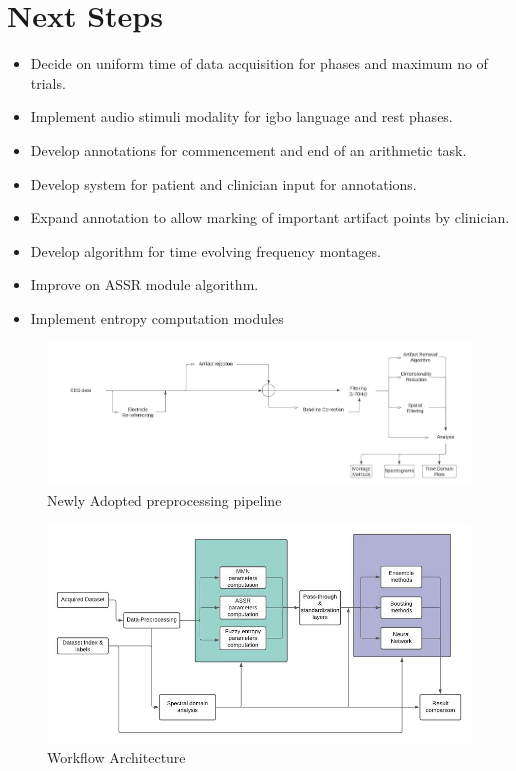 \documentclass[conference]{IEEEconf}
\begin{document}
\section{Next Steps}\label{sec:actionPoints}
\begin{itemize}
  \item Decide on uniform time of data acquisition for phases and maximum no of trials.
  \item Implement audio stimuli modality for igbo language and rest phases.
  \item Develop annotations for commencement and end of an arithmetic task.
  \item Develop system for patient and clinician input for annotations.
  \item Expand annotation to allow marking of important artifact points by clinician.
  \item Develop algorithm for time evolving frequency montages.
  \item Improve on ASSR module algorithm.
  \item Implement entropy computation modules
\end{itemize}

\clearpage
\begin{figure}
  \includegraphics{preProcessing.jpeg}
  \caption{Newly Adopted preprocessing pipeline}
  \label{fig:preprocessPipeline}
\end{figure}
\begin{figure}
  \includegraphics{workflowArchitecture.jpeg}
  \caption{Workflow Architecture}
  \label{fig:workflow Architecture}
\end{figure}
\end{document}
